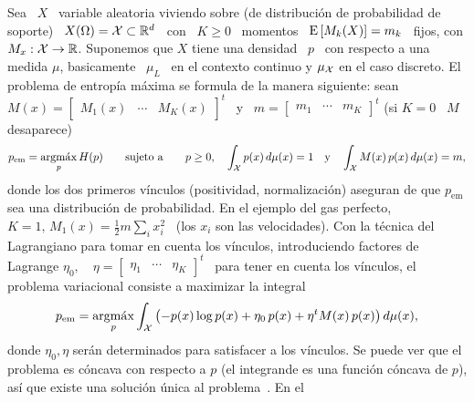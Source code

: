 Sea \ $X$ \ variable aleatoria viviendo sobre (de distribuci\'on de probabilidad
de soporte) \ $X(\Omega) = \mathcal{X} \subset \mathbb{R}^d$  \ con \ $K \ge 0$ \ momentos \
$\operatorname{E}\left[ M_k(X)  \right] = m_k$ \  fijos, con $M_x: \mathcal{X}  \to \mathbb{R}$. Suponemos
que $X$ tiene una densidad \ $p$ \ con respecto a una medida $\mu$, basicamente \
$\mu_L$ \ en el contexto continuo y $\mu_{\mathcal{X}}$ en el caso discreto. El problema de
entrop\'ia  m\'axima   se  formula  de   la  manera  siguiente:  sean   \  $M(x)
=  \begin{bmatrix}  M_1(x)  &  \cdots   &  M_K(x)  \end{bmatrix}^t$  \  y  \  $m
=  \begin{bmatrix} m_1  &  \cdots  & m_K  \end{bmatrix}^t$  (si $K  =  0$ \  $M$
desaparece)
%
\[
p_{\mathrm{em}}  =   \operatorname*{argm\acute{a}x}_p  H(p)  \qquad   \mbox{sujeto  a}  \qquad   p  \ge
0, \quad \int_{\mathcal{X}} p(x) \, d\mu(x) = 1 \quad \mbox{y}
\quad \int_{\mathcal{X}} M(x) \, p(x) \, d\mu(x) = m,
\]
%
donde los dos primeros v\'inculos (positividad, normalizaci\'on) aseguran de que
$p_{\mathrm{em}}$ sea una distribuci\'on de  probabilidad. En el ejemplo del gas
perfecto, $K  = 1,  \, M_1(x) =  \frac12 m  \sum_i x_i^2$ \  (los $x_i$  son las
velocidades).   Con  la t\'ecnica  del  Lagrangiano  para  tomar en  cuenta  los
v\'inculos,   introduciendo   factores   de   Lagrange   $\eta_0,   \quad   \eta
= \begin{bmatrix}  \eta_1 &  \cdots &  \eta_K \end{bmatrix}^t$  \ para  tener en
cuenta  los  v\'inculos,  el  problema   variacional  consiste  a  maximizar  la
integral~\cite{GelFom63, Bru04, Mil00, CamMar09, CovTho06}
%
\[
p_{\mathrm{em}} =  \operatorname*{argm\acute{a}x}_p \int_{\mathcal{X}} \left(  - p(x) \log  p(x) + \eta_0  \, p(x)
  + \eta^t M(x) \, p(x) \right) d\mu(x),
\]
%
donde $\eta_0, \eta$  ser\'an determinados para satisfacer a  los v\'inculos. Se
puede ver que el problema es c\'oncava  con respecto a $p$ (\ie el integrande es
una funci\'on  c\'oncava de  $p$), as\'i  que existe  una soluci\'on  \'unica al
problema~\cite{GelFom63, Wei74,  Bru04, Mil00,  CamMar09, Cla13, Kom14}.   En el
